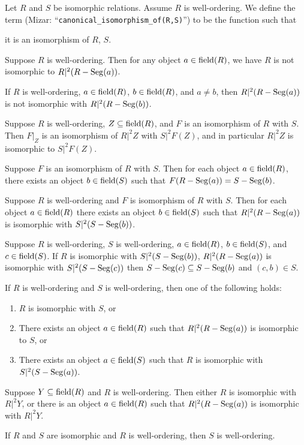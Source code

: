 \documentclass{article}
\begin{document}
\begin{definition}
Let $R$ and $S$ be isomorphic relations. Assume $R$ is well-ordering.
We define the term 
(Mizar: ``\verb#canonical_isomorphism_of(R,S)#'') to be the function
such that
\begin{defn}
\item it is an isomorphism of $R$, $S$.
\end{defn}
\end{definition}

\begin{thm}
\item\label{wellord1:46} Suppose $R$ is well-ordering.
  Then for any object $a\in\operatorname{field}(R)$, we have $R$ is not isomorphic to $R|^{2}(R-\operatorname{Seg}(a))$.
\item\label{wellord1:47} If $R$ is well-ordering, $a\in\operatorname{field}(R)$,
  $b\in\operatorname{field}(R)$, and $a\neq b$, then $R|^{2}(R-\operatorname{Seg}(a))$ is not
  isomorphic with $R|^{2}(R-\operatorname{Seg}(b))$.
\item\label{wellord1:48} Suppose $R$ is well-ordering,
  $Z\subseteq\operatorname{field}(R)$, and $F$ is an isomorphism of $R$ with $S$.
  Then $F|_{Z}$ is an isomorphism of $R|^{2}Z$ with $S|^{2}F(Z)$, and in
  particular $R|^{2}Z$ is isomorphic to $S|^{2}F(Z)$.
\item\label{wellord1:49} Suppose $F$ is an isomorphism of $R$ with $S$.
  Then for each object $a\in\operatorname{field}(R)$, there exists an object
  $b\in\operatorname{field}(S)$ such that $F(R-\operatorname{Seg}(a))=S-\operatorname{Seg}(b)$.
\item\label{wellord1:50} Suppose $R$ is well-ordering and $F$ is
  isomorphism of $R$ with $S$.
  Then for each object $a\in\operatorname{field}(R)$ there exists an object $b\in\operatorname{field}(S)$
  such that $R |^{2} (R-\operatorname{Seg}(a))$ is isomorphic with $S |^2 (S-\operatorname{Seg}(b))$.
\item\label{wellord1:51} Suppose $R$ is well-ordering,
  $S$ is well-ordering, $a\in\operatorname{field}(R)$, $b\in\operatorname{field}(S)$, and
  $c\in\operatorname{field}(S)$.
  If $R$ is isomorphic with $S |^{2} (S-\operatorname{Seg}(b))$,
  $R |^{2} (R-\operatorname{Seg}(a))$ is isomorphic with $S|^{2} (S-\operatorname{Seg}(c))$
  then $S-\operatorname{Seg}(c) \subseteq S-\operatorname{Seg}(b)$ and $(c,b)\in S$.
\item\label{wellord1:52} If $R$ is well-ordering and $S$ is
  well-ordering, then one of the following holds:
  \begin{enumerate}[label=(\roman*)]
  \item $R$ is isomorphic with $S$, or
  \item There exists an object $a\in\operatorname{field}(R)$ such that $R |^{2} (R-\operatorname{Seg}(a))$
    is isomorphic to $S$, or
  \item There exists an object $a\in\operatorname{field}(S)$ such that $R$ is
    isomorphic with $S |^{2} (S-\operatorname{Seg}(a))$.
  \end{enumerate}
\item\label{wellord1:53} Suppose $Y\subseteq\operatorname{field}(R)$ and $R$ is
  well-ordering.
  Then either $R$ is isomorphic with $R |^{2} Y$, or
  there is an object $a\in\operatorname{field}(R)$ such that
  $R |^{2} (R-\operatorname{Seg}(a))$ is isomorphic with $R |^{2} Y$.
\item\label{wellord1:54} If $R$ and $S$ are isomorphic and $R$ is well-ordering, then
  $S$ is well-ordering.
\end{thm}
\end{document}
